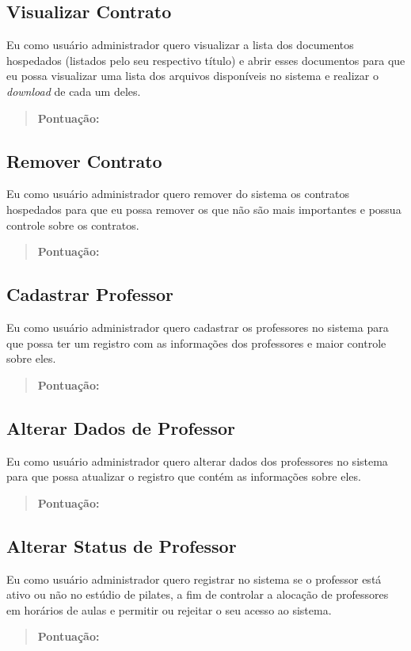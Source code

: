 \subsection[Visualizar Contrato]{Visualizar Contrato}
Eu como usuário administrador quero visualizar a lista dos documentos hospedados
(listados pelo seu respectivo título) e abrir esses documentos para que eu possa
visualizar uma lista dos arquivos disponíveis no sistema e realizar o \textsl{download}
de cada um deles.
\begin{quote}
    \textbf{Pontuação:}
\end{quote}

\subsection[Remover Contrato]{Remover Contrato}
Eu como usuário administrador quero remover do sistema os contratos hospedados
para que eu possa remover os que não são mais importantes e possua controle
sobre os contratos.
\begin{quote}
    \textbf{Pontuação:}
\end{quote}

\subsection[Cadastrar Professor]{Cadastrar Professor}
Eu como usuário administrador quero cadastrar os professores no sistema para
que possa ter um registro com as informações dos professores e maior controle
sobre eles.
\begin{quote}
    \textbf{Pontuação:}
\end{quote}

\subsection[Alterar Dados de Professor]{Alterar Dados de Professor}
Eu como usuário administrador quero alterar dados dos professores no sistema
para que possa atualizar o registro que contém as informações sobre eles.
\begin{quote}
    \textbf{Pontuação:}
\end{quote}

\subsection[Alterar Status de Professor]{Alterar Status de Professor}
Eu como usuário administrador quero registrar no sistema se o professor está
ativo ou não no estúdio de pilates, a fim de controlar a alocação de
professores em horários de aulas e permitir ou rejeitar o seu acesso ao sistema.
\begin{quote}
    \textbf{Pontuação:}
\end{quote}

